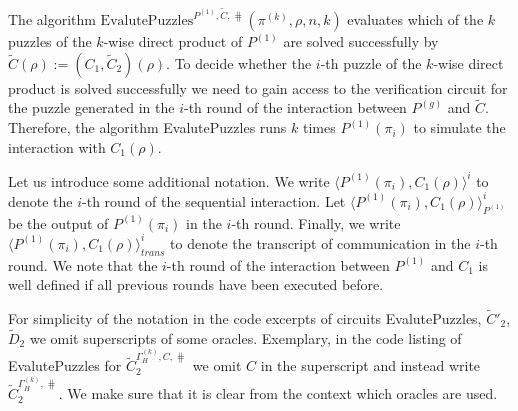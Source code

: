 %
The algorithm $\text{EvalutePuzzles}^{P^{(1)}, \widetilde{C}, \hash}(\pi^{(k)}, \rho, n, k)$
evaluates which of the $k$ puzzles of the $k$-wise direct product of $P^{(1)}$ are solved successfully by $\widetilde{C}(\rho) := (C_1,\widetilde{C}_2)(\rho)$.
To decide whether the $i$-th puzzle of the $k$-wise direct product is solved successfully we need to gain access to the verification circuit
for the puzzle generated in the $i$-th round of the interaction between $P^{(g)}$ and $\widetilde{C}$.
Therefore, the algorithm EvalutePuzzles runs $k$ times $P^{(1)}(\pi_i)$ to simulate the interaction with
$C_1(\rho)$.

Let us introduce some additional notation.
We write $\langle P^{(1)}(\pi_i), C_1(\rho)\rangle^i$ to denote the $i$-th round of the sequential interaction.
Let $\langle P^{(1)}(\pi_i), C_1(\rho)\rangle^i_{P^{(1)}}$ be the output of $P^{(1)}(\pi_i)$ in the $i$-th round.
Finally, we write $\langle P^{(1)}(\pi_i), C_1(\rho)\rangle^i_{\mathit{trans}}$ to denote the transcript of communication in the $i$-th round.
We note that the $i$-th round of the interaction between $P^{(1)}$ and $C_1$ is well defined if all previous rounds have been executed before.

For simplicity of the notation in the code excerpts of circuits EvalutePuzzles, $\widetilde{C}'_2$, $\widetilde{D}_2$ we omit superscripts of some oracles.
Exemplary, in the code listing of EvalutePuzzles for $\widetilde{C}_2^{\Gamma_H^{(k)}, C, \hash}$ we omit $C$ in the superscript and instead write $\widetilde{C}_2^{\Gamma_H^{(k)}, \hash}$.
We make sure that it is clear from the context which oracles are used.

